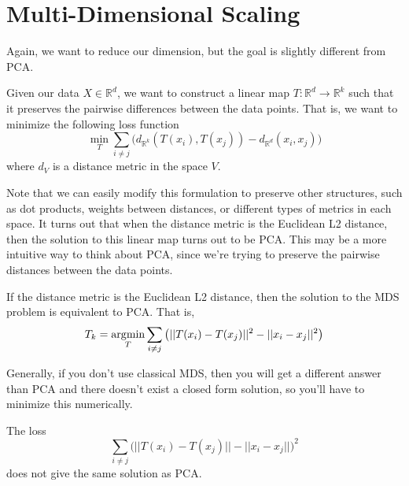 \section{Multi-Dimensional Scaling}

  Again, we want to reduce our dimension, but the goal is slightly different from PCA. 

  \begin{definition}
    Given our data $X \in \mathbb{R}^d$, we want to construct a linear map $T: \mathbb{R}^d \rightarrow \mathbb{R}^k$ such that it preserves the pairwise differences between the data points. That is, we want to minimize the following loss function 
    \begin{equation}
      \min_{T} \sum_{i \neq j} \big( d_{\mathbb{R}^k}(T(x_i), T(x_j)) - d_{\mathbb{R}^d}(x_i, x_j) \big)
    \end{equation}
    where $d_{V}$ is a distance metric in the space $V$. 
  \end{definition}

  Note that we can easily modify this formulation to preserve other structures, such as dot products, weights between distances, or different types of metrics in each space. It turns out that when the distance metric is the Euclidean L2 distance, then the solution to this linear map turns out to be PCA. This may be a more intuitive way to think about PCA, since we're trying to preserve the pairwise distances between the data points. 

  \begin{theorem}
    If the distance metric is the Euclidean L2 distance, then the solution to the MDS problem is equivalent to PCA. That is, 
    \begin{equation}
      T_k = \operatorname*{\arg\!\min}_{T} \sum_{i \neq j} \big( ||T(x_i) - T(x_j)||^2 - ||x_i - x_j||^2 \big)
    \end{equation}
  \end{theorem}

  Generally, if you don't use classical MDS, then you will get a different answer than PCA and there doesn't exist a closed form solution, so you'll have to minimize this numerically. 

  \begin{example}
    The loss 
    \begin{equation}
      \sum_{i \neq j}  \big( ||T(x_i) - T(x_j)|| - ||x_i - x_j|| \big)^2 
    \end{equation}
    does not give the same solution as PCA. 
  \end{example}


